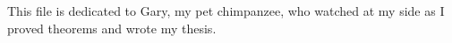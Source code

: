 %
%
%
%
This file is dedicated to Gary, my pet chimpanzee, who watched at
my side as I proved theorems and wrote my thesis.
